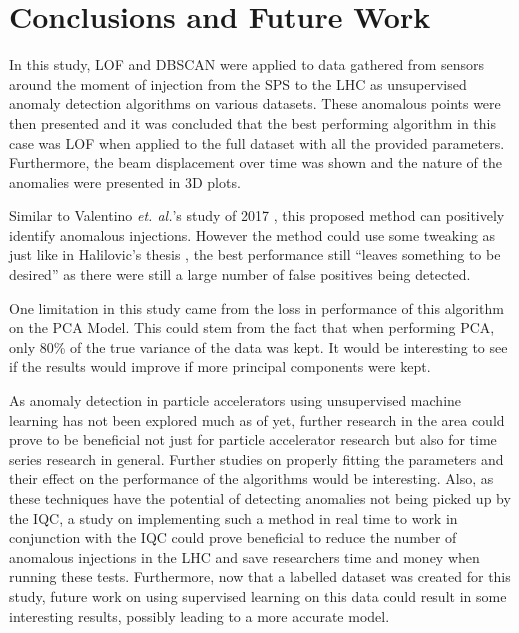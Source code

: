 \documentclass[conference, a4paper]{IEEEtran}
\begin{document}
	\section{Conclusions and Future Work}

	\par In this study, LOF and DBSCAN were applied to data gathered from sensors around the moment of injection from the SPS to the LHC as unsupervised anomaly detection algorithms on various datasets. These anomalous points were then presented and it was concluded that the best performing algorithm in this case was LOF when applied to the full dataset with all the provided parameters. Furthermore, the beam displacement over time was shown and the nature of the anomalies were presented in 3D plots.
	
	\par Similar to Valentino \textit{et. al.}'s study of 2017 \cite{Valentino2017}, this proposed method can positively identify anomalous injections. However the method could use some tweaking as just like in Halilovic's thesis \cite{Halilovic2018}, the best performance still ``leaves something to be desired'' as there were still a large number of false positives being detected.
	
	\par One limitation in this study came from the loss in performance of this algorithm on the PCA Model. This could stem from the fact that when performing PCA, only 80\% of the true variance of the data was kept. It would be interesting to see if the results would improve if more principal components were kept.
	
	\par As anomaly detection in particle accelerators using unsupervised machine learning has not been explored much as of yet, further research in the area could prove to be beneficial not just for particle accelerator research but also for time series research in general. Further studies on properly fitting the parameters and their effect on the performance of the algorithms would be interesting. Also, as these techniques have the potential of detecting anomalies not being picked up by the IQC, a study on implementing such a method in real time to work in conjunction with the IQC could prove beneficial to reduce the number of anomalous injections in the LHC and save researchers time and money when running these tests. Furthermore, now that a labelled dataset was created for this study, future work on using supervised learning on this data could result in some interesting results, possibly leading to a more accurate model.
	
	
	
\end{document}
